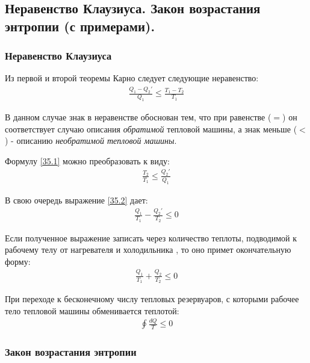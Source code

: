 \subsection{Неравенство Клаузиуса. Закон возрастания энтропии (с примерами).}
\subsubsection*{Неравенство Клаузиуса}
Из первой и второй теоремы Карно следует следующие неравенство:
\begin{align} \label{35.1}
	\frac{Q_1 - Q_2'}{Q_1} \leqslant \frac{T_1 - T_2}{T_1}
\end{align}

В данном случае знак в неравенстве обоснован тем, что при равенстве ($=$) он соответствует случаю описания \textit{обратимой} тепловой машины, а знак меньше ($<$) - описанию \textit{необратимой тепловой машины}.

Формулу \eqref{35.1} можно преобразовать к виду:
\begin{align} \label{35.2}
	\frac{T_2}{T_1} \leqslant \frac{Q_2'}{Q_1}
\end{align}

В свою очередь выражение \eqref{35.2} дает:
\begin{align} \label{35.3}
	\frac{Q_1}{T_1} - \frac{Q_2'}{T_2} \leqslant 0
\end{align}

Если полученное выражение записать через количество теплоты, подводимой к рабочему телу от нагревателя  и холодильника , то оно примет окончательную форму:
\begin{align} \label{35.4}
	\boxed{\frac{Q_1}{T_1} + \frac{Q_2}{T_2} \leqslant 0}
\end{align}

При переходе к бесконечному числу тепловых резервуаров, с которыми рабочее тело тепловой машины обменивается теплотой:
\begin{align} \label{35.5}
	\boxed{\oint \frac{d Q}{T} \leqslant 0}
\end{align}

\subsubsection*{Закон возрастания энтропии}

